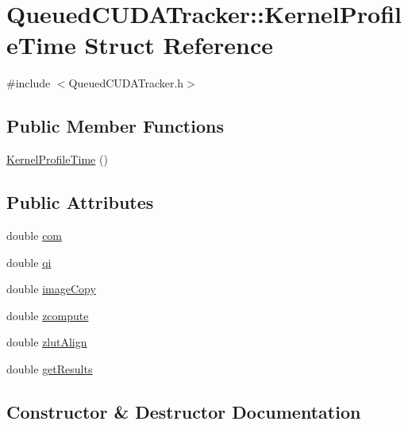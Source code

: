 \hypertarget{struct_queued_c_u_d_a_tracker_1_1_kernel_profile_time}{}\section{Queued\+C\+U\+D\+A\+Tracker\+:\+:Kernel\+Profile\+Time Struct Reference}
\label{struct_queued_c_u_d_a_tracker_1_1_kernel_profile_time}


{\ttfamily \#include $<$Queued\+C\+U\+D\+A\+Tracker.\+h$>$}

\subsection*{Public Member Functions}
\begin{DoxyCompactItemize}
\item 
\hyperlink{struct_queued_c_u_d_a_tracker_1_1_kernel_profile_time_a1a07dbca36d95a1627ea510bbabcb6c2}{Kernel\+Profile\+Time} ()
\end{DoxyCompactItemize}
\subsection*{Public Attributes}
\begin{DoxyCompactItemize}
\item 
double \hyperlink{struct_queued_c_u_d_a_tracker_1_1_kernel_profile_time_a9f9415edf045228fd79007621df104c1}{com}
\item 
double \hyperlink{struct_queued_c_u_d_a_tracker_1_1_kernel_profile_time_af6247f72c0dea94c0a3edbb373476741}{qi}
\item 
double \hyperlink{struct_queued_c_u_d_a_tracker_1_1_kernel_profile_time_a04abd82cbcc70357b2a2901f490a1662}{image\+Copy}
\item 
double \hyperlink{struct_queued_c_u_d_a_tracker_1_1_kernel_profile_time_a45f6db270eccf8e2c8653b6cd05c7339}{zcompute}
\item 
double \hyperlink{struct_queued_c_u_d_a_tracker_1_1_kernel_profile_time_a140d7024006f4957e23b2cb85cba0edc}{zlut\+Align}
\item 
double \hyperlink{struct_queued_c_u_d_a_tracker_1_1_kernel_profile_time_a82d70a87770af92a63fd0b414d3ec2af}{get\+Results}
\end{DoxyCompactItemize}


\subsection{Constructor \& Destructor Documentation}
